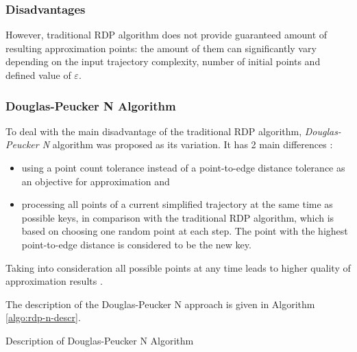 \bigbreak

\subsubsection{Disadvantages}

However, traditional RDP algorithm does not provide guaranteed amount of resulting approximation points: the amount of them can significantly vary depending on the input trajectory complexity, number of initial points and defined value of $\varepsilon$.

\subsubsection{Douglas-Peucker N Algorithm}

To deal with the main disadvantage of the traditional RDP algorithm, \textit{Douglas-Peucker N} algorithm was proposed as its variation. It has 2 main differences \cite{online:rdp_algo_var}: 

\begin{itemize}
	\setlength\itemsep{0em}
	\item using a point count tolerance instead of a point-to-edge distance tolerance as an objective for approximation and 
	\item processing all points of a current simplified trajectory at the same time as possible keys, in comparison with the traditional RDP algorithm, which is based on choosing one random point at each step. The point with the highest point-to-edge distance is considered to be the new key.
\end{itemize}

Taking into consideration all possible points at any time leads to higher quality of approximation results \cite{online:rdp_algo_var}.

The description of the Douglas-Peucker N approach is given in Algorithm \ref{algo:rdp-n-descr}.

\begin{algorithm}[!htb]
	\caption{Description of Douglas-Peucker N Algorithm}
	\label{algo:rdp-n-descr}
	\SetAlgoLined
	
\end{algorithm}


